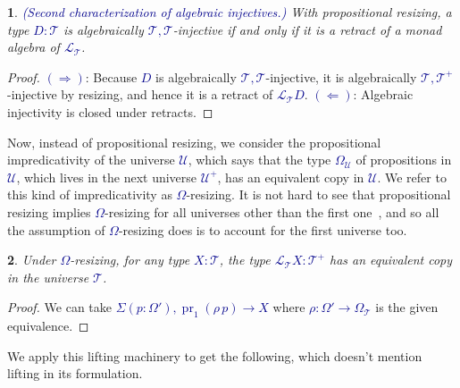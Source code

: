\documentclass[10pt]{article}
\newcommand{\db}{\textcolor{darkblue}}
\newcommand{\df}[1]{\emph{\db{#1}}}
\newcommand{\m}[1]{\db{$#1$}}
\newcommand{\fst}{\operatorname{pr}_1}
\newcommand{\U}{\mathcal{U}}
\newcommand{\T}{\mathcal{T}}
\newcommand{\Lift}{\mathcal{L}}
\newtheorem{numbered}{}
\theoremstyle{definition}
\begin{document}
\begin{numbered} \df{(Second characterization of algebraic injectives.)}
  With propositional resizing, a type \m{D:\T} is algebraically
  \m{\T,\T}-injective if and only if it is a retract of a monad
  algebra of \m{\Lift_\T}.
\end{numbered}
\begin{proof}
  \m{(\Rightarrow)}: Because \m{D} is algebraically
  \m{\T,\T}-injective, it is algebraically \m{\T,\T^+}-injective by
  resizing, and hence it is a retract of \m{\Lift_\T D}.
%
  \m{(\Leftarrow)}: Algebraic injectivity is closed under retracts.
\end{proof}



Now, instead of propositional resizing, we consider the propositional
impredicativity of the universe \m{\U}, which says that the type
\m{\Omega_\U} of propositions in \m{\U}, which lives in the next
universe \m{\U^+}, has an equivalent copy in \m{\U}. We refer to this
kind of impredicativity as \m{\Omega}-resizing. It is not hard to see
that propositional resizing implies \m{\Omega}-resizing for all
universes other than the first one~\cite{TypeTopology}, and so all
the assumption of \m{\Omega}-resizing does is to account
for the first universe too.

%

\begin{numbered}
  Under \m{\Omega}-resizing, for any type \m{X:\T}, the type
  \m{\Lift_{\T} X : \T^+} has an equivalent copy in the universe \m{\T}.
\end{numbered}
\begin{proof}
  We can take \m{\Sigma (p : \Omega'), \fst(\rho \, p) \to X} where \m{\rho : \Omega' \to \Omega_\T} is the given equivalence.
\end{proof}

We apply this lifting machinery to get the following, which doesn't
mention lifting in its formulation.
\end{document}
